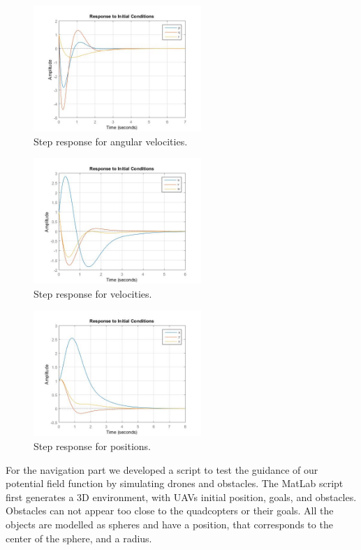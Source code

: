 \documentclass[journal]{IEEEtran}
\begin{document}
		\begin{figure}[H]
  			\centering
  			\includegraphics[width=2.5in]{Results/Controll/Fig2}
  			\caption{Step response for angular velocities.}
  			\label{fig:contresangvel}
		\end{figure}	

		\begin{figure}[H]
  			\centering
  			\includegraphics[width=2.5in]{Results/Controll/Fig3}
  			\caption{Step response for velocities.}
  			\label{fig:contresvel}
		\end{figure}	
		
		\begin{figure}[H]
  			\centering
  			\includegraphics[width=2.5in]{Results/Controll/Fig4}
  			\caption{Step response for positions.}
  			\label{fig:contrespos}
		\end{figure}	

	
	For the navigation part we developed a script to test the guidance of our potential field function by simulating drones and obstacles. The MatLab script first generates a 3D environment, with UAVs initial position, goals, and obstacles. Obstacles can not appear too close to the quadcopters or their goals. All the objects are modelled as spheres and have a position, that corresponds to the center of the sphere, and a radius.\\
	
\end{document}
